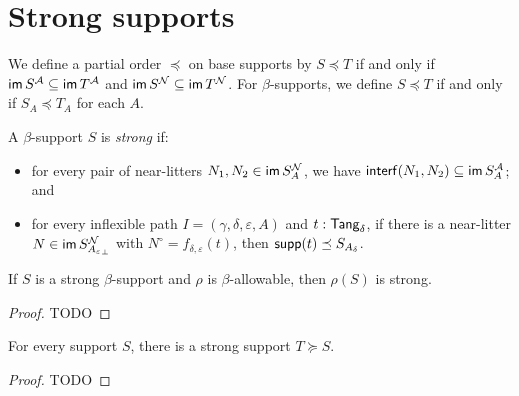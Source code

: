 \section{Strong supports}
\begin{definition}
  \label{def:StrSupport.Occurs}
  We define a partial order \( \preceq \) on base supports by \( S \preceq T \) if and only if \( \operatorname{\mathsf{im}} S^{\mathcal A} \subseteq \operatorname{\mathsf{im}} T^{\mathcal A} \) and \( \operatorname{\mathsf{im}} S^{\mathcal N} \subseteq \operatorname{\mathsf{im}} T^{\mathcal N} \).
  For \( \beta \)-supports, we define \( S \preceq T \) if and only if \( S_A \preceq T_A \) for each \( A \).
\end{definition}
\begin{definition}
  \label{def:Strong}
  A \( \beta \)-support \( S \) is \emph{strong} if:
  \begin{itemize}
    \item for every pair of near-litters \( N_1, N_2 \in \operatorname{\mathsf{im}} S_A^{\mathcal N} \), we have \( \operatorname{\mathsf{interf}}(N_1, N_2) \subseteq \operatorname{\mathsf{im}} S_A^{\mathcal A} \); and
    \item for every inflexible path \( I = (\gamma,\delta,\varepsilon,A) \) and \( t : \mathsf{Tang}_\delta \), if there is a near-litter \( N \in \operatorname{\mathsf{im}} S_{{A_\varepsilon}_\bot}^{\mathcal N} \) with \( N^\circ = f_{\delta,\varepsilon}(t) \), then \( \operatorname{\mathsf{supp}}(t) \preceq S_{A_\delta} \).
  \end{itemize}
\end{definition}
\begin{proposition}
  \label{prop:Strong.smul}
  If \( S \) is a strong \( \beta \)-support and \( \rho \) is \( \beta \)-allowable, then \( \rho(S) \) is strong.
\end{proposition}
\begin{proof}
  TODO
\end{proof}
\begin{proposition}
  \label{prop:exists_strong}
  For every support \( S \), there is a strong support \( T \succeq S \).
\end{proposition}
\begin{proof}
  TODO
\end{proof}

